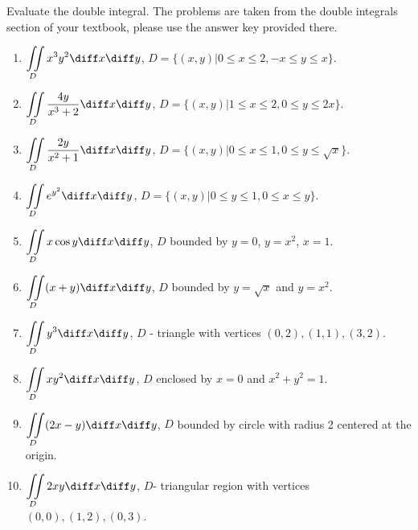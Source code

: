 Evaluate the double integral. The problems are taken from the double integrals section of your textbook, please use the answer key provided there.

\begin{enumerate}
\item $\displaystyle \iint\limits_{D} x^3y^2 \diff x \diff y $, $D=\{(x,y)| 0\leq x \leq 2, -x\leq y \leq x \}$.
\item $\displaystyle \iint\limits_{D} \frac{4y}{x^3+2}\diff x \diff y $, $D=\{(x,y)| 1\leq x\leq 2, 0 \leq y\leq 2x\}$.
\item $\displaystyle \iint\limits_{D}\frac{2y}{x^2+1} \diff x \diff y $, $D=\{(x,y)|0\leq x \leq 1, 0 \leq y \leq \sqrt{x} \}$.
\item $\displaystyle \iint\limits_{D}e^{y^2} \diff x \diff y $, $D=\{(x,y)|0\leq y \leq 1, 0\leq  x\leq y \}$.
\item $\displaystyle \iint\limits_{D} x\cos y \diff x \diff y $, $D$ bounded by $y=0$, $y=x^2$, $x=1$.
\item $\displaystyle \iint\limits_{D} (x+y)\diff x \diff y $, $D$ bounded by $y=\sqrt{x}$ and $y=x^2$.
\item $\displaystyle \iint\limits_{D}y^3 \diff x \diff y $, $D$ - triangle with vertices $(0,2), (1,1), (3,2)$.
\item $\displaystyle \iint\limits_{D} xy^2 \diff x \diff y $, $D$ enclosed by $x=0$ and $x^2+y^2=1$.
\item $\displaystyle \iint\limits_{D} (2x-y)\diff x \diff y $, $D$ bounded by circle with radius 2 centered at the origin.
\item $\displaystyle \iint\limits_{D} 2xy\diff x \diff y $, $D$- triangular region with vertices $(0,0), (1,2), (0,3)$.
\end{enumerate}